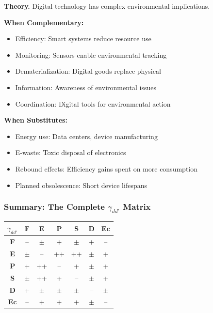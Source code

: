 \textbf{Theory.}
Digital technology has complex environmental implications.

\textbf{When Complementary:}
\begin{itemize}
    \item Efficiency: Smart systems reduce resource use
    \item Monitoring: Sensors enable environmental tracking
    \item Dematerialization: Digital goods replace physical
    \item Information: Awareness of environmental issues
    \item Coordination: Digital tools for environmental action
\end{itemize}

\textbf{When Substitutes:}
\begin{itemize}
    \item Energy use: Data centers, device manufacturing
    \item E-waste: Toxic disposal of electronics
    \item Rebound effects: Efficiency gains spent on more consumption
    \item Planned obsolescence: Short device lifespans
\end{itemize}


\subsubsection{Summary: The Complete $\gamma_{dd'}$ Matrix}

\begin{center}
\renewcommand{\arraystretch}{1.4}
\begin{tabular}{|c|c|c|c|c|c|c|}
\hline
$\gamma_{dd'}$ & \textbf{F} & \textbf{E} & \textbf{P} & \textbf{S} & \textbf{D} & \textbf{Ec} \\
\hline
\textbf{F} & -- & $\pm$ & \cellcolor{green!20}+ & $\pm$ & \cellcolor{green!20}+ & \cellcolor{red!20}-- \\
\textbf{E} & $\pm$ & -- & \cellcolor{green!30}++ & \cellcolor{green!30}++ & $\pm$ & \cellcolor{green!20}+ \\
\textbf{P} & \cellcolor{green!20}+ & \cellcolor{green!30}++ & -- & \cellcolor{green!20}+ & $\pm$ & \cellcolor{green!20}+ \\
\textbf{S} & $\pm$ & \cellcolor{green!30}++ & \cellcolor{green!20}+ & -- & $\pm$ & \cellcolor{green!20}+ \\
\textbf{D} & \cellcolor{green!20}+ & $\pm$ & $\pm$ & $\pm$ & -- & $\pm$ \\
\textbf{Ec} & \cellcolor{red!20}-- & \cellcolor{green!20}+ & \cellcolor{green!20}+ & \cellcolor{green!20}+ & $\pm$ & -- \\
\hline
\end{tabular}
\end{center}

